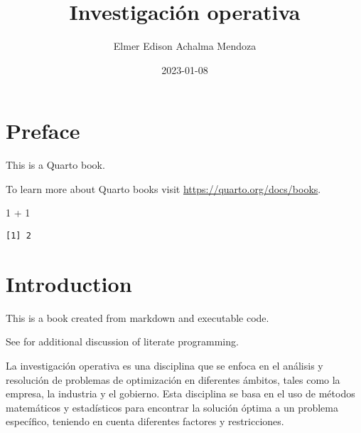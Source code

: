 \documentclass[
  letterpaper,
  DIV=11,
  numbers=noendperiod]{scrreprt}
\title{Investigación operativa}
\author{Elmer Edison Achalma Mendoza}
\date{2023-01-08}
\newenvironment{Shaded}{}{}
\newcommand{\DecValTok}[1]{\textcolor[rgb]{0.00,0.36,0.77}{#1}}
\newcommand{\SpecialCharTok}[1]{\textcolor[rgb]{0.00,0.36,0.77}{#1}}
\renewcommand*\contentsname{Tabla de contenidos}
\newcommand\contentsname{Tabla de contenidos}
\theoremstyle{definition}
\theoremstyle{definition}
\theoremstyle{remark}
\begin{document}
\maketitle
\ifdefined\Shaded\renewenvironment{Shaded}{\begin{tcolorbox}[interior hidden, boxrule=0pt, frame hidden, sharp corners, borderline west={3pt}{0pt}{shadecolor}, breakable, enhanced]}{\end{tcolorbox}}\fi

\renewcommand*\contentsname{Tabla de contenidos}
{
\hypersetup{linkcolor=}
\setcounter{tocdepth}{2}
\tableofcontents
}

\hypertarget{preface}{%
\chapter*{Preface}\label{preface}}


This is a Quarto book.

To learn more about Quarto books visit
\url{https://quarto.org/docs/books}.

\begin{Shaded}
\begin{Highlighting}[]
\DecValTok{1} \SpecialCharTok{+} \DecValTok{1}
\end{Highlighting}
\end{Shaded}

\begin{verbatim}
[1] 2
\end{verbatim}


\hypertarget{introduction}{%
\chapter*{Introduction}\label{introduction}}


This is a book created from markdown and executable code.

See \textcite{knuth84} for additional discussion of literate
programming.

La investigación operativa es una disciplina que se enfoca en el
análisis y resolución de problemas de optimización en diferentes
ámbitos, tales como la empresa, la industria y el gobierno. Esta
disciplina se basa en el uso de métodos matemáticos y estadísticos para
encontrar la solución óptima a un problema específico, teniendo en
cuenta diferentes factores y restricciones.
\end{document}
